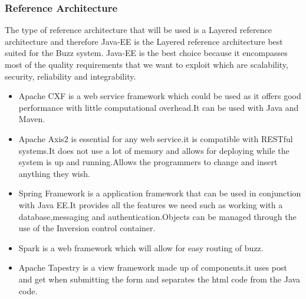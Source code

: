 \subsubsection{Reference Architecture}

The type of reference architecture that will be used is a Layered reference architecture and therefore 
Java-EE is the Layered reference architecture best suited for the Buzz system. Java-EE is the best choice
because it encompasses most of the quality requirements that we want to exploit which are scalability, security,
reliability and integrability.
\begin{itemize}
\item Apache CXF is a web service framework which could be used as it offers good performance with little computational overhead.It can be used with Java and Maven.
\item Apache Axis2 is essential for any web service.it is compatible with RESTful systems.It does not use a lot of memory and allows for deploying while the system is up and running.Allows the programmers to change and insert anything they wish.
\item Spring Framework is a application framework that can be used in conjunction with Java EE.It provides all the features we need such as working with a database,messaging and authentication.Objects can be managed through the use of the Inversion control container.
\item Spark is a web framework which will allow for easy routing of buzz.
\item Apache Tapestry is a view framework made up of components.it uses post and get when submitting the form and separates the html code from the Java code.
\end{itemize}